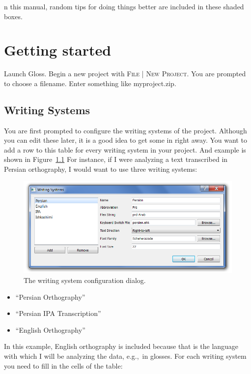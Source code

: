 \documentclass[oneside]{book}
\def\eg{e.g.,~}
\def\menu#1{\textsc{#1}}
\def\menu#1#2{\textsc{#1 | #2}}
\def\gloss{\textsf{Gloss}}
\def\fig#1{Figure~\ref{#1}}
\def\tip#1\par{\medskip\noindent\fcolorbox{black}{light-gray}{\parbox{\textwidth}{#1}}\par\medskip}
\begin{document}
\tip In this manual, random tips for doing things better are included in these shaded boxes.

\chapter{Getting started}
Launch \gloss. Begin a new project with \menu{File}{New Project}. You are prompted to choose a filename. Enter something like myproject.zip.

\section{Writing Systems}
You are first prompted to configure the writing systems of the project. Although you can edit these later, it is a good idea to get some in right away. You want to add a row to this table for every writing system in your project. And example is shown in \fig{fig:ws} For instance, if I were analyzing a text transcribed in Persian orthography, I would want to use three writing systems:

\begin{figure}
\includegraphics[width=\textwidth]{languages.png}
\caption{The writing system configuration dialog.}\label{fig:ws}
\end{figure}

\begin{itemize}
\item ``Persian Orthography''
\item ``Persian IPA Transcription''
\item ``English Orthography''
\end{itemize}
In this example, English orthography is included because that is the language with which I will be analyzing the data, \eg in glosses. For each writing system you need to fill in the cells of the table:
\end{document}
